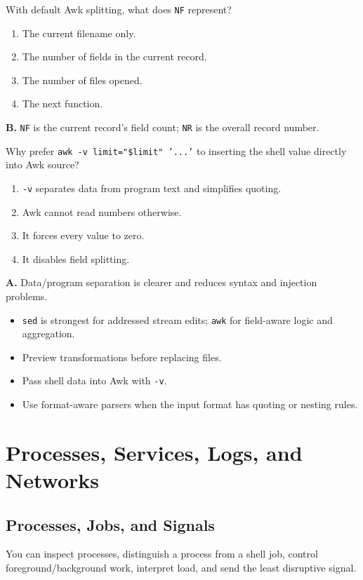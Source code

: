 \documentclass[11pt,oneside,openany]{book}
\newcommand{\fourchoices}[4]{%
  \begin{enumerate}[label=\Alph*),leftmargin=2em,itemsep=0.25em]
    \item #1
    \item #2
    \item #3
    \item #4
  \end{enumerate}}
\newcommand{\chaptergoals}[1]{%
  \begin{tcolorbox}[colback=Paper,colframe=Blue,title={Learning outcomes},fonttitle=\bfseries]
  #1
  \end{tcolorbox}}
\begin{document}
\begin{questionbox}[title={Medium 12.1 -- Awk fields}]
With default Awk splitting, what does \texttt{NF} represent?
\fourchoices{The current filename only.}{The number of fields in the current record.}{The number of files opened.}{The next function.}
\end{questionbox}
\begin{answerbox}
\textbf{B.} \texttt{NF} is the current record's field count; \texttt{NR} is the overall record number.
\end{answerbox}

\begin{questionbox}[title={Hard 12.2 -- Variable transfer}]
Why prefer \texttt{awk -v limit="\$limit" '...'} to inserting the shell value directly into Awk source?
\fourchoices{\texttt{-v} separates data from program text and simplifies quoting.}{Awk cannot read numbers otherwise.}{It forces every value to zero.}{It disables field splitting.}
\end{questionbox}
\begin{answerbox}
\textbf{A.} Data/program separation is clearer and reduces syntax and injection problems.
\end{answerbox}

\begin{recapbox}
\begin{itemize}
  \item \texttt{sed} is strongest for addressed stream edits; \texttt{awk} for field-aware logic and aggregation.
  \item Preview transformations before replacing files.
  \item Pass shell data into Awk with \texttt{-v}.
  \item Use format-aware parsers when the input format has quoting or nesting rules.
\end{itemize}
\end{recapbox}

\part{Processes, Services, Logs, and Networks}

\chapter{Processes, Jobs, and Signals}
\chaptergoals{You can inspect processes, distinguish a process from a shell job, control foreground/background work, interpret load, and send the least disruptive signal.}
\end{document}
